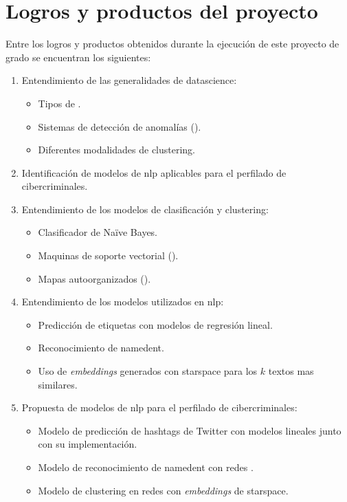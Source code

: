 \chapter{Logros y productos del proyecto} %

\label{chap:achievements} %

Entre los logros y productos obtenidos durante la ejecución de este proyecto de grado se encuentran los siguientes:

\begin{enumerate}
\item Entendimiento de las generalidades de \gls{datascience}:
  \begin{itemize}
  \item Tipos de .
  \item Sistemas de detección de anomalías ().
  \item Diferentes modalidades de \gls{clustering}.
  \end{itemize}
\item Identificación de modelos de \gls{nlp} aplicables para el perfilado de cibercriminales.
\item Entendimiento de los modelos de clasificación y \gls{clustering}:
  \begin{itemize}
  \item Clasificador de Na\"ive Bayes.
  \item Maquinas de soporte vectorial ().
  \item Mapas autoorganizados ().
  \end{itemize}
\item Entendimiento de los modelos utilizados en \gls{nlp}:
  \begin{itemize}
  \item Predicción de etiquetas con modelos de regresión lineal.
  \item Reconocimiento de \gls{namedent}.
  \item Uso de \emph{embeddings} generados con \gls{starspace} para los $k$ textos mas similares.
  \end{itemize}
\item Propuesta de modelos de \gls{nlp} para el perfilado de cibercriminales:
  \begin{itemize}
  \item Modelo de predicción de hashtags de Twitter con modelos lineales junto con su implementación.
  \item Modelo de reconocimiento de \gls{namedent} con redes .
  \item Modelo de \gls{clustering} en redes  con \emph{embeddings} de \gls{starspace}.
  \end{itemize}
\end{enumerate}
